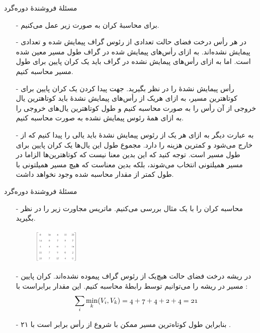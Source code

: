 \begin{frame}{مسئلهٔ فروشندهٔ دوره‌گرد}
\begin{itemize}\itemr
\item[-]
برای محاسبهٔ کران به صورت زیر عمل می‌کنیم.
\item[-]
در هر رأس درخت فضای حالت تعدادی از رئوس گراف پیمایش شده و تعدادی پیمایش نشده‌اند.
به ازای رأس‌های پیمایش شده در گراف طول مسیر معین شده است. اما به ازای رأس‌های پیمایش نشده در گراف باید یک کران پایین برای طول مسیر محاسبه کنیم.
\item[-]
رأس پیمایش نشدهٔ
را در نظر بگیرید. جهت پیدا کردن یک کران پایین برای کوتاهترین مسیر،
به ازای هریک از رأس‌های پیمایش نشدهٔ
باید کوتاهترین یال خروجی از آن رأس را به صورت
 محاسبه کنیم و طول کوتاهترین یال‌های خروجی را به ازای همهٔ رئوس پیمایش نشده به صورت
محاسبه کنیم.
\item[-]
 به عبارت دیگر به ازای هر یک از رئوس پیمایش نشدهٔ
باید یالی را پیدا کنیم که از
خارج می‌شود و کمترین هزینه را دارد.
مجموع طول این یال‌ها یک کران پایین برای طول مسیر است.
توجه کنید که این بدین معنا نیست که کوتاهترین‌ها الزاما در مسیر همیلتونی انتخاب می‌شوند، بلکه بدین معناست که هیچ مسیر همیلتونی با طول کمتر از مقدار محاسبه شده وجود نخواهد داشت.
\end{itemize}
\end{frame} 


\begin{frame}{مسئلهٔ فروشندهٔ دوره‌گرد}
\begin{itemize}\itemr
\item[-]
محاسبه کران را با یک مثال بررسی می‌کنیم. ماتریس مجاورت زیر را در نظر بگیرید.
\begin{figure}
\includegraphics[width=0.2\textwidth]{figs/chap06/263-tsp-matrix}
\end{figure}
\item[-]
در ریشه درخت فضای حالت هیچ‌یک از رئوس گراف پیموده نشده‌اند. کران پایین مسیر در ریشه را می‌توانیم توسط رابطهٔ
محاسبه کنیم. این مقدار برابراست با :
\begin{align*}
\mathnormal{\sum_i \min_k (V_i,V_k) = 4 + 7 + 4 + 2 + 4 = 21}
\end{align*}
\item[-]
بنابراین طول کوتاه‌ترین مسیر ممکن با شروع از رأس 
برابر است با ۲۱ .
\end{itemize}
\end{frame} 

